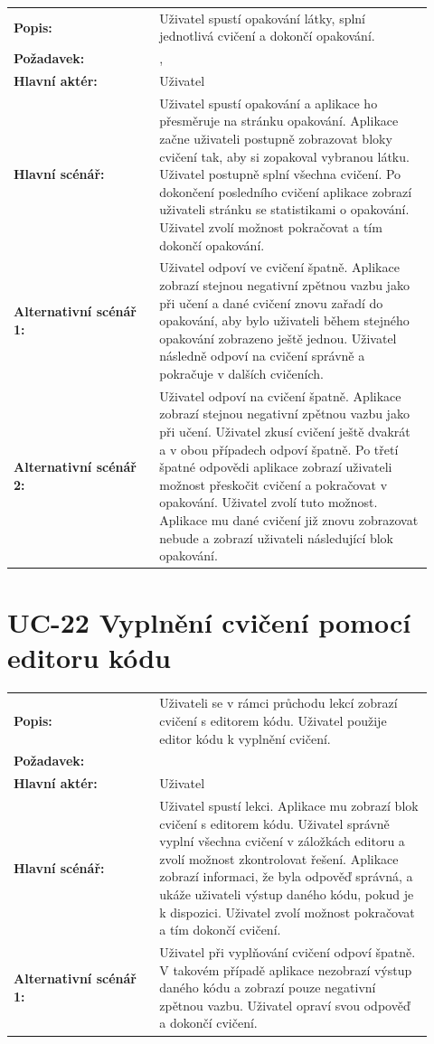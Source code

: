\begin{tabular}{p{0.32\linewidth}p{0.6\linewidth}}
  \textbf{Popis:} & Uživatel spustí opakování látky, splní jednotlivá cvičení a dokončí opakování. \\
  \textbf{Požadavek:} & \nameref{sec:fp-learning-structure}, \nameref{sec:fp-exercise-blocks} \\
  \textbf{Hlavní aktér:} & Uživatel \\
  \textbf{Hlavní scénář:} & Uživatel spustí opakování a aplikace ho přesměruje na stránku opakování. Aplikace začne uživateli postupně zobrazovat bloky cvičení tak, aby si zopakoval vybranou látku. Uživatel postupně splní všechna cvičení. Po dokončení posledního cvičení aplikace zobrazí uživateli stránku se statistikami o opakování. Uživatel zvolí možnost pokračovat a tím dokončí opakování. \\
  \textbf{Alternativní scénář 1:} & Uživatel odpoví ve cvičení špatně. Aplikace zobrazí stejnou negativní zpětnou vazbu jako při učení a dané cvičení znovu zařadí do opakování, aby bylo uživateli během stejného opakování zobrazeno ještě jednou. Uživatel následně odpoví na cvičení správně a pokračuje v dalších cvičeních. \\
  \textbf{Alternativní scénář 2:} & Uživatel odpoví na cvičení špatně. Aplikace zobrazí stejnou negativní zpětnou vazbu jako při učení. Uživatel zkusí cvičení ještě dvakrát a v obou případech odpoví špatně. Po třetí špatné odpovědi aplikace zobrazí uživateli možnost přeskočit cvičení a pokračovat v opakování. Uživatel zvolí tuto možnost. Aplikace mu dané cvičení již znovu zobrazovat nebude a zobrazí uživateli následující blok opakování. \\
\end{tabular}

\section{UC-22 Vyplnění cvičení pomocí editoru kódu}\label{sec:uc-22}

\begin{tabular}{p{0.32\linewidth}p{0.6\linewidth}}
  \textbf{Popis:} & Uživateli se v rámci průchodu lekcí zobrazí cvičení s editorem kódu. Uživatel použije editor kódu k vyplnění cvičení.  \\
  \textbf{Požadavek:} & \nameref{sec:fp-code-editor} \\
  \textbf{Hlavní aktér:} & Uživatel \\
  \textbf{Hlavní scénář:} & Uživatel spustí lekci. Aplikace mu zobrazí blok cvičení s editorem kódu. Uživatel správně vyplní všechna cvičení v záložkách editoru a zvolí možnost zkontrolovat řešení. Aplikace zobrazí informaci, že byla odpověď správná, a ukáže uživateli výstup daného kódu, pokud je k dispozici. Uživatel zvolí možnost pokračovat a tím dokončí cvičení. \\
  \textbf{Alternativní scénář 1:} & Uživatel při vyplňování cvičení odpoví špatně. V takovém případě aplikace nezobrazí výstup daného kódu a zobrazí pouze negativní zpětnou vazbu. Uživatel opraví svou odpověď a dokončí cvičení. \\
\end{tabular}


